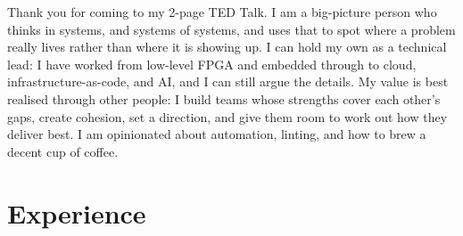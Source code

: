 \else%
Thank you for coming to my 2-page TED Talk.
I am a big-picture person who thinks in systems, and systems of systems, and uses that to spot where a problem really lives rather than where it is showing up.
I can hold my own as a technical lead: I have worked from low-level FPGA and embedded through to cloud, infrastructure-as-code, and AI, and I can still argue the details.
My value is best realised through other people: I build teams whose strengths cover each other's gaps, create cohesion, set a direction, and give them room to work out how they deliver best.
I am opinionated about automation, linting, and how to brew a decent cup of coffee.

\fi\fi

%
%
\sectionsep{}\section{Experience}









% 
% 
% 
% 
% 

\iftechnical%
\else%

\fi

